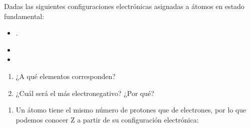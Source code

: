 \begin{question}
    Dadas las siguientes configuraciones electrónicas asignadas
    a átomos en estado fundamental:

    \begin{itemize}
        \item {}.
        \item {}
        \item {}
    \end{itemize}

    \begin{enumerate}[label=\letraminuscula]
    \item ¿A qué elementos corresponden?
    \item ¿Cuál será el más electronegativo? ¿Por qué?
    \end{enumerate}


    \begin{solu}
        \begin{enumerate}[label=\letraminuscula]
            \item Un átomo tiene el mismo número de protones que de
            electrones, por lo que podemos conocer Z a partir de su
            configuración electrónica:


\end{enumerate}
\end{solu}
\end{question}
